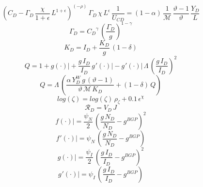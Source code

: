 \documentclass[10pt,a4paper]{article}
\begin{document}
\begin{dmath}
\left({C_D}-{\Gamma_D}\, \frac{\chi}{1+\epsilon}\, {L}^{1+\epsilon}\right)^{\left(-\rho\right)}\, {\Gamma_D}\, \chi\, {L}^{\epsilon}\, \frac{1}{{U_{CD}}}=\left(1-\alpha\right)\, \frac{1}{\mathcal{M}}\, \frac{\vartheta-1}{\vartheta}\, \frac{{Y_D}}{{L}}
\end{dmath}
\begin{dmath}
{\Gamma_D}={C_D}^{\gamma}\, \left(\frac{{\Gamma_D}}{{g}}\right)^{1-\gamma}
\end{dmath}
\begin{dmath}
{K_D}={I_D}+\frac{{K_D}}{{g}}\, \left(1-\delta\right)
\end{dmath}
\begin{dmath}
{Q}=1+{\left.       g\left( \cdot \right)            \right|}+\frac{{g}\, {I_D}}{{I_D}}\, {\left.       g^‎{\prime}\left( \cdot \right)   \right|}-{\left.       g^‎{\prime}\left( \cdot \right)   \right|}\, {\Lambda}\, \left(\frac{{g}\, {I_D}}{{I_D}}\right)^{2}
\end{dmath}
\begin{dmath}
{Q}={\Lambda}\, \left(\frac{\alpha\, {Y^W_D}\, {g}\, \left(\vartheta-1\right)}{\vartheta\, \mathcal{M}\, {K_D}}+\left(1-\delta\right)\, {Q}\right)
\end{dmath}
\begin{dmath}
log\left({\zeta}\right)=log\left({\zeta}\right)\, {\rho}_{\zeta}+0.1\, {\epsilon}^{\chi}
\end{dmath}
\begin{dmath}
{\mathcal{R}_{D}}={V_D}\, {J}
\end{dmath}
\begin{dmath}
{\left.       f\left( \cdot \right)            \right|}=\frac{\psi_N}{2}\, \left(\frac{{g}\, {N_D}}{{N_D}}-g^{BGP}\right)^{2}
\end{dmath}
\begin{dmath}
{\left.       f^‎{\prime}\left( \cdot \right)   \right|}=\psi_N\, \left(\frac{{g}\, {N_D}}{{N_D}}-g^{BGP}\right)
\end{dmath}
\begin{dmath}
{\left.       g\left( \cdot \right)            \right|}=\frac{\psi_I}{2}\, \left(\frac{{g}\, {I_D}}{{I_D}}-g^{BGP}\right)^{2}
\end{dmath}
\begin{dmath}
{\left.       g^‎{\prime}\left( \cdot \right)   \right|}=\psi_I\, \left(\frac{{g}\, {I_D}}{{I_D}}-g^{BGP}\right)
\end{dmath}
\end{document}
